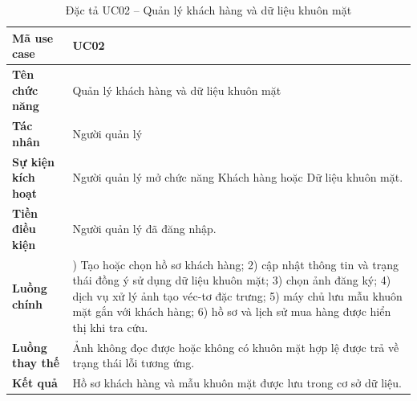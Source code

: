 \documentclass[../LuanVan.tex]{subfiles}
\begin{document}
\begin{table}[H]
    \centering
    \caption{Đặc tả UC02 -- Quản lý khách hàng và dữ liệu khuôn mặt}
    \label{tab:uc02_customer_ch4}
    \begin{tabular}{|>{\raggedright\arraybackslash}p{3.0cm}|>{\raggedright\arraybackslash}p{10.9cm}|}
        \hline
        \textbf{Mã use case} & UC02 \\
        \hline
        \textbf{Tên chức năng} & Quản lý khách hàng và dữ liệu khuôn mặt \\
        \hline
        \textbf{Tác nhân} & Người quản lý \\
        \hline
        \textbf{Sự kiện kích hoạt} & Người quản lý mở chức năng Khách hàng hoặc Dữ liệu khuôn mặt. \\
        \hline
        \textbf{Tiền điều kiện} & Người quản lý đã đăng nhập. \\
        \hline
        \textbf{Luồng chính} & 1) Tạo hoặc chọn hồ sơ khách hàng; 2) cập nhật thông tin và trạng thái đồng ý sử dụng dữ liệu khuôn mặt; 3) chọn ảnh đăng ký; 4) dịch vụ xử lý ảnh tạo véc-tơ đặc trưng; 5) máy chủ lưu mẫu khuôn mặt gắn với khách hàng; 6) hồ sơ và lịch sử mua hàng được hiển thị khi tra cứu. \\
        \hline
        \textbf{Luồng thay thế} & Ảnh không đọc được hoặc không có khuôn mặt hợp lệ được trả về trạng thái lỗi tương ứng. \\
        \hline
        \textbf{Kết quả} & Hồ sơ khách hàng và mẫu khuôn mặt được lưu trong cơ sở dữ liệu. \\
        \hline
    \end{tabular}
\end{table}
\end{document}
